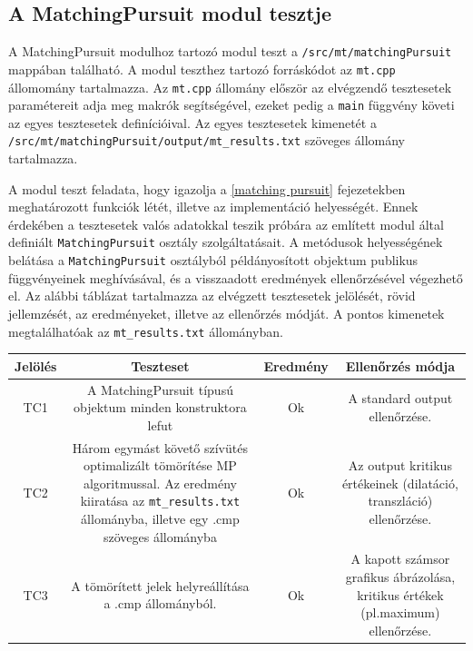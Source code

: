 \documentclass[oneside,titlepage,12pt,a4paper]{report}
\begin{document}
\subsection{A MatchingPursuit modul tesztje}

A MatchingPursuit modulhoz tartozó modul teszt a \texttt{/src/mt/matchingPursuit} mappában található. A modul teszthez tartozó forráskódot az \texttt{mt.cpp} állomomány tartalmazza. Az \texttt{mt.cpp} állomány először az elvégzendő tesztesetek paramétereit adja meg makrók segítségével, ezeket pedig a \texttt{main} függvény követi az egyes tesztesetek definícióival. Az egyes tesztesetek kimenetét a \texttt{/src/mt/matchingPursuit/output/mt\_results.txt} szöveges állomány tartalmazza. 
\par A modul teszt feladata, hogy igazolja a \ref{matching pursuit} fejezetekben meghatározott funkciók létét, illetve az implementáció helyességét. Ennek érdekében a tesztesetek valós adatokkal teszik próbára az említett modul által definiált \texttt{MatchingPursuit} osztály szolgáltatásait. A metódusok helyességének belátása a \texttt{MatchingPursuit} osztályból példányosított objektum publikus függvényeinek meghívásával, és a visszaadott eredmények ellenőrzésével végezhető el. Az alábbi táblázat tartalmazza az elvégzett tesztesetek jelölését, rövid jellemzését, az eredményeket, illetve az ellenőrzés módját. A pontos kimenetek megtalálhatóak az \texttt{mt\_results.txt} állományban.

\begin{center}
\begin{adjustbox}{width=1\textwidth}
 \begin{tabular}{||c c c c||} 
 \hline
 Jelölés & Teszteset & Eredmény &  Ellenőrzés módja \\ [0.5ex] 
 \hline\hline
 TC1 & A MatchingPursuit típusú objektum minden konstruktora lefut &  Ok & A standard output ellenőrzése. \\ 
 \hline
 TC2 & Három egymást követő szívütés optimalizált tömörítése MP algoritmussal. Az eredmény kiiratása az \texttt{mt\_results.txt} állományba, illetve egy .cmp szöveges állományba &  Ok & Az output kritikus értékeinek (dilatáció, transzláció) ellenőrzése. \\
 \hline
 TC3 & A tömörített jelek helyreállítása a .cmp állományból. & Ok & A kapott számsor grafikus ábrázolása, kritikus értékek (pl.maximum) ellenőrzése. \\
 \hline
\end{tabular}
\end{adjustbox}
\end{center}
\end{document}
